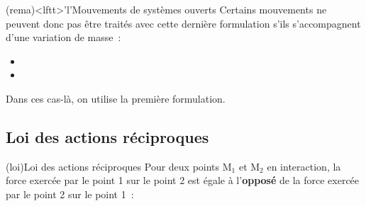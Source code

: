 \documentclass[../../main/main.tex]{subfiles}
\begin{document}
\begin{tcb}(rema)<lftt>'l'{Mouvements de systèmes ouverts}
	Certains mouvements ne peuvent donc pas être traités avec cette dernière
	formulation s'ils s'accompagnent d'une variation de masse~:
	\begin{itemize}
		\item {}
		\item {}
	\end{itemize}
	Dans ces cas-là, on utilise la première formulation.
\end{tcb}

\subsection{Loi des actions réciproques}

\begin{tcb*}[sidebyside](loi){Loi des actions réciproques}
	Pour deux points M$_1$ et M$_2$ en interaction, la force exercée par le point
	1 sur le point 2 est égale à l'\textbf{opposé} de la force exercée par le
	point 2 sur le point 1~:
	\psw{%
		\[\boxed{\Ff_{1\ra2} = - \Ff_{2\ra1}}\]
	}%
	\vspace{-15pt}
	\tcblower
	\begin{center}
		\vspace{-15pt}
	\end{center}
\end{tcb*}
\end{document}
